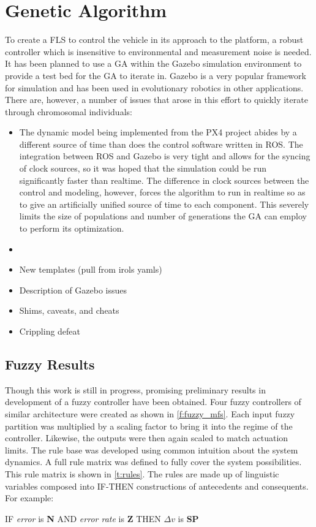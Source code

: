\section{Genetic Algorithm}
To create a FLS to control the vehicle in its approach to the platform, a robust controller which is
insensitive to environmental and measurement noise is needed. It has been planned to use a GA within the
Gazebo simulation environment to provide a test bed for the GA to iterate in. Gazebo is a very popular
framework for simulation and has been used in evolutionary robotics in other
applications\cite{nogueira2014comparative}. There are, however, a number of issues that arose in this effort
to quickly iterate through chromosomal individuals:

\begin{itemize}
    \item The dynamic model being implemented from the PX4 project\cite{martin2010true} abides by a different
        source of time than does the control software written in ROS. The integration between ROS and Gazebo
        is very tight and allows for the syncing of clock sources, so it was hoped that the simulation could
        be run significantly faster than realtime. The difference in clock sources between the control and
        modeling, however, forces the algorithm to run in realtime so as to give an artificially unified
        source of time to each component. This severely limits the size of populations and number of
        generations the GA can employ to perform its optimization.
    \item 
\end{itemize}


\begin{itemize}
    \item New templates (pull from irols yamls)
    \item Description of Gazebo issues
    \item Shims, caveats, and cheats
    \item Crippling defeat
\end{itemize}

\subsection{Fuzzy Results}
Though this work is still in progress, promising preliminary results in development of a fuzzy controller have
been obtained. Four fuzzy controllers of similar architecture were created as shown in \cref{f:fuzzy_mfs}.
Each input fuzzy partition was multiplied by a scaling factor to bring it into the regime of the controller.
Likewise, the outputs were then again scaled to match actuation limits. The rule base was developed using
common intuition about the system dynamics. A full rule matrix was defined to fully cover the system
possibilities. This rule matrix is shown in \cref{t:rules}. The rules are made up of linguistic variables
composed into IF-THEN constructions of antecedents and consequents. For example:
\begin{center}
    IF \emph{error} is \textbf{N} AND \emph{error rate} is \textbf{Z} THEN \emph{$\Delta v$} is \textbf{SP}
\end{center}

